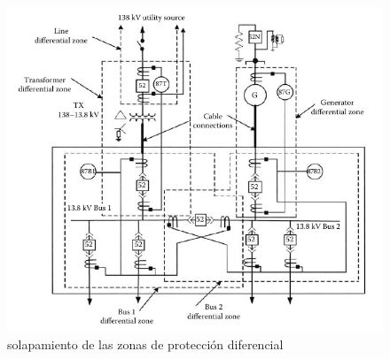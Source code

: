 \documentclass[a5paper]{book}%
\begin{document}
\begin{figure}[H]
	\centering
	\includegraphics[width=\linewidth]{diferencial_tranformador}
	\caption{solapamiento de las zonas de protección diferencial}
	\label{fig:zonas_diferencial}
\end{figure}
\end{document}
